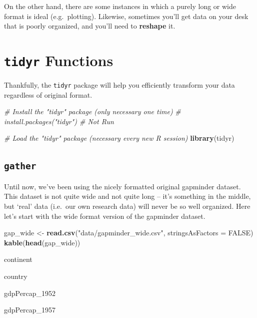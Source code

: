 \documentclass[]{book}
\newenvironment{Shaded}{\begin{snugshade}}{\end{snugshade}}
\newcommand{\KeywordTok}[1]{\textcolor[rgb]{0.13,0.29,0.53}{\textbf{#1}}}
\newcommand{\DataTypeTok}[1]{\textcolor[rgb]{0.13,0.29,0.53}{#1}}
\newcommand{\StringTok}[1]{\textcolor[rgb]{0.31,0.60,0.02}{#1}}
\newcommand{\CommentTok}[1]{\textcolor[rgb]{0.56,0.35,0.01}{\textit{#1}}}
\newcommand{\OtherTok}[1]{\textcolor[rgb]{0.56,0.35,0.01}{#1}}
\newcommand{\NormalTok}[1]{#1}
\begin{document}
On the other hand, there are some instances in which a purely long or
wide format is ideal (e.g.~plotting). Likewise, sometimes you'll get
data on your desk that is poorly organized, and you'll need to
\textbf{reshape} it.

\section{\texorpdfstring{\texttt{tidyr}
Functions}{tidyr Functions}}\label{tidyr-functions}

Thankfully, the \texttt{tidyr} package will help you efficiently
transform your data regardless of original format.

\begin{Shaded}
\begin{Highlighting}[]
\CommentTok{# Install the "tidyr" package (only necessary one time)}
\CommentTok{# install.packages("tidyr") # Not Run}

\CommentTok{# Load the "tidyr" package (necessary every new R session)}
\KeywordTok{library}\NormalTok{(tidyr)}
\end{Highlighting}
\end{Shaded}

\subsection{\texorpdfstring{\texttt{gather}}{gather}}\label{gather}

Until now, we've been using the nicely formatted original gapminder
dataset. This dataset is not quite wide and not quite long -- it's
something in the middle, but `real' data (i.e.~our own research data)
will never be so well organized. Here let's start with the wide format
version of the gapminder dataset.

\begin{Shaded}
\begin{Highlighting}[]
\NormalTok{gap_wide <-}\StringTok{ }\KeywordTok{read.csv}\NormalTok{(}\StringTok{"data/gapminder_wide.csv"}\NormalTok{, }\DataTypeTok{stringsAsFactors =} \OtherTok{FALSE}\NormalTok{)}
\KeywordTok{kable}\NormalTok{(}\KeywordTok{head}\NormalTok{(gap_wide))}
\end{Highlighting}
\end{Shaded}

continent

country

gdpPercap\_1952

gdpPercap\_1957
\end{document}
